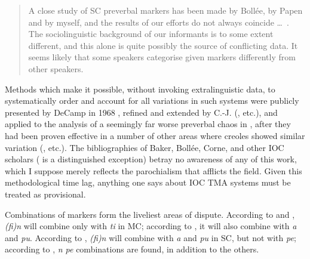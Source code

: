 \begin{quote}
A close study of SC preverbal markers has been made by Bollée, by Papen and by myself, and the results of our efforts do not always coincide \ldots~. The sociolinguistic background of our informants is to some extent different, and this alone is quite possibly the source of conflicting data. It seems likely that some speakers categorise given markers differently from other speakers.
\end{quote}

Methods which make it possible, without invoking extralinguistic data, to systematically order and account for all variations in such systems were publicly presented by DeCamp in 1968 \citep{DeCamp1971}, refined and extended by C.-J. \citeauthor{Bailey1973} (\citeyear{Bailey1973}, etc.), and applied to the analysis of a seemingly far worse preverbal chaos in \citet{Bickerton1975}, after they had been proven effective in a number of other areas where creoles showed similar variation (\citealt{Bickerton1971,Bickerton1973a,Bickerton1973b}, etc.). The bibliographies of Baker, Bollée, Corne, and other IOC scholars (\citealt{CarayolEtAl1977} is a distinguished exception) betray no awareness of any of this work, which I suppose merely reflects the parochialism that afflicts the field. Given this methodological time lag, anything one says about IOC TMA systems must be treated as provisional.

Combinations of markers form the liveliest areas of dispute. According to \citet{Baker1972} and \citet{Valdman1980}, \textit{(fi)n} will combine only with \textit{ti} in MC; according to \citet{Moorghen1975}, it will also combine with \textit{a} and \textit{pu}. According to \citet{Bollee1977}, \textit{(fi)n} will combine with \textit{a} and \textit{pu} in SC, but not with \textit{pe}; according to \citet{Corne1977}, \textit{n pe} com\-binations are found, in addition to the others.

